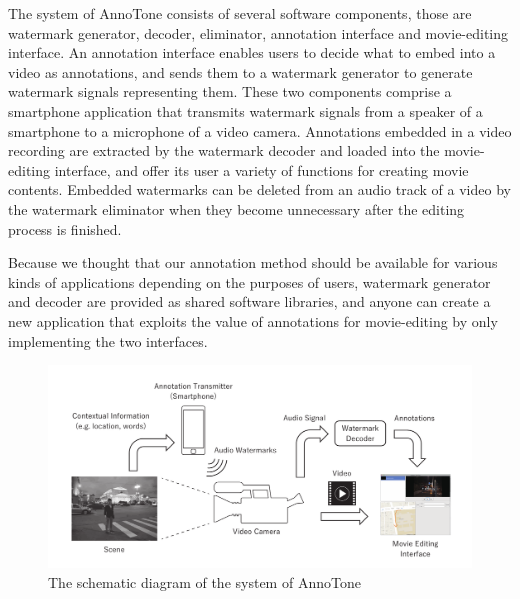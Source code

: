The system of AnnoTone consists of several software components, those are watermark generator, decoder, eliminator, annotation interface and movie-editing interface.
An annotation interface enables users to decide what to embed into a video as annotations, and sends them to a watermark generator to generate watermark signals representing them.
These two components comprise a smartphone application that transmits watermark signals from a speaker of a smartphone to a microphone of a video camera.
Annotations embedded in a video recording are extracted by the watermark decoder and loaded into the movie-editing interface, and offer its user a variety of functions for creating movie contents.
Embedded watermarks can be deleted from an audio track of a video by the watermark eliminator when they become unnecessary after the editing process is finished.

Because we thought that our annotation method should be available for various kinds of applications depending on the purposes of users, watermark generator and decoder are provided as shared software libraries, and anyone can create a new application that exploits the value of annotations for movie-editing by only implementing the two interfaces.

\begin{figure}[htbp]
 \begin{center}
  \vspace{5mm}
  \includegraphics[width=135mm]{overview.pdf}
 \end{center}
 \caption{The schematic diagram of the system of AnnoTone}
 \label{fig:one}
\end{figure}
